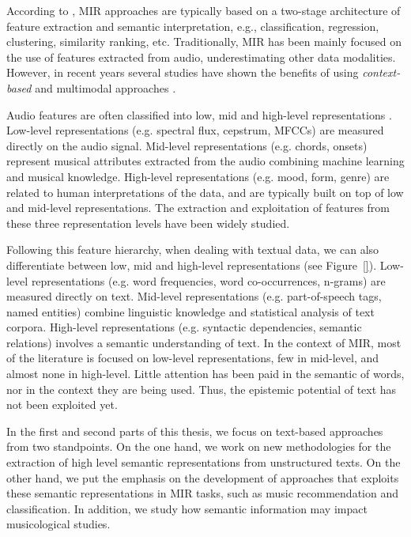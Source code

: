 According to \cite{humphrey2012}, MIR approaches are typically based on a two-stage architecture of feature extraction and semantic interpretation, e.g., classification, regression, clustering, similarity ranking, etc. 
Traditionally, MIR has been mainly focused on the use of features extracted from audio, underestimating other data modalities. However, in recent years several studies have shown the benefits of using \textit{context-based} and multimodal approaches \cite{Schedl2014}. 

Audio features are often classified into low, mid and high-level representations \cite{bello2015}. Low-level representations (e.g. spectral flux, cepstrum, MFCCs) are measured directly on the audio signal. Mid-level representations (e.g. chords, onsets) represent musical attributes extracted from the audio combining machine learning and musical knowledge. High-level representations (e.g. mood, form, genre) are related to human interpretations of the data, and are typically built on top of low and mid-level representations. The extraction and exploitation of features from these three representation levels have been widely studied. 

Following this feature hierarchy, when dealing with textual data, we can also differentiate between low, mid and high-level representations (see Figure~\ref{}). Low-level representations (e.g. word frequencies, word co-occurrences, n-grams) are measured directly on text. Mid-level representations (e.g. part-of-speech tags, named entities) combine linguistic knowledge and statistical analysis of text corpora. High-level representations (e.g. syntactic dependencies, semantic relations) involves a semantic understanding of text. In the context of MIR, most of the literature is focused on low-level representations, few in mid-level, and almost none in high-level. Little attention has been paid in the semantic of words, nor in the context they are being used. Thus, the epistemic potential of text has not been exploited yet.

In the first and second parts of this thesis, we focus on text-based approaches from two standpoints. On the one hand, we work on new methodologies for the extraction of high level semantic representations from unstructured texts. On the other hand, we put the emphasis on the development of approaches that exploits these semantic representations in MIR tasks, such as music recommendation and classification. In addition, we study how semantic information may impact musicological studies.

